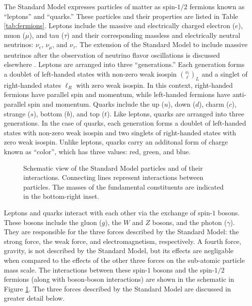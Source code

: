 The Standard Model expresses particles of matter as spin-$1/2$ fermions
known as ``leptons'' and ``quarks.''  These particles and their properties
are listed in Table \ref{tab:fermions}.
Leptons include the massive and electrically charged electron ($e$), muon ($\mu$), and tau ($\tau$)
and their corresponding massless and electrically neutral neutrinos: $\nu_{e}$, $\nu_{\mu}$, and $\nu_{\tau}$.  
The extension of the Standard Model to include massive neutrinos
after the observation of neutrino flavor oscillations is discussed 
elsewhere \cite{standard-model-massive-neutrinos}.
Leptons are arranged into three ``generations.''  Each generation forms a 
doublet of left-handed states with non-zero weak isospin $\binom{\nu_\ell}{\ell}_{L}$ 
and a singlet of right-handed states $\ell_{R}$ with zero weak isospin.
In this context, right-handed fermions have parallel spin and momentum, while
left-handed fermions have anti-parallel spin and momentum.
Quarks include the up ($u$), down ($d$), charm ($c$), strange ($s$),
bottom ($b$), and top ($t$).  Like leptons, quarks
are arranged into three generations.  In the case of quarks, each generation
forms a doublet of left-handed states with non-zero weak isospin 
and two singlets of right-handed states with zero weak isospin.
Unlike leptons, quarks carry an additonal form of charge known as ``color'', which
has three values: red, green, and blue.

\begin{figure}[htbc]
  \begin{center}
    
  \end{center}
  \caption{\label{fig:smParticles} 
    Schematic view of the Standard Model particles and of their interactions. 
    Connecting lines represent interactions between particles.  
    The masses of the fundamental constituents are indicated in the bottom-right inset.}
\end{figure}

Leptons and quarks interact with each other via the exchange of spin-$1$ bosons.
These bosons include the gluon ($g$), the $W$ and $Z$ bosons, and the photon ($\gamma$).
They are responsible for the three forces described by the Standard Model:
the strong force, the weak force, and electromagnetism, respectively.  
A fourth force, gravity, is not described by the Standard Model, but its effects
are negligable when compared to the effects of the other three forces 
on the sub-atomic particle mass scale.
The interactions between these spin-$1$ bosons and the spin-$1/2$ fermions 
(along with boson-boson interactions) are shown 
in the schematic in Figure \ref{fig:smParticles}.  The three forces described by 
the Standard Model are discussed in greater detail below.

